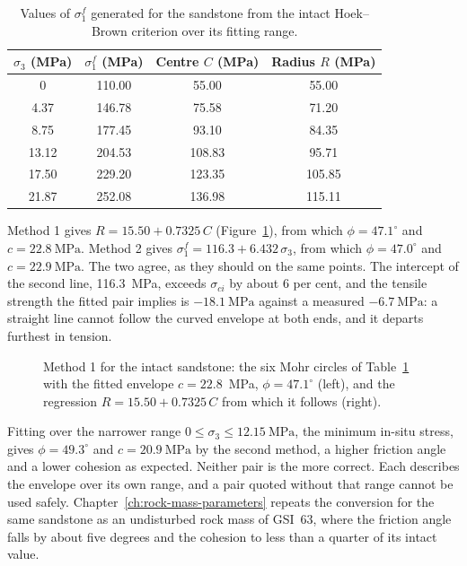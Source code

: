 \begin{table}[htbp]
\caption{Values of \(\sigma_1^f\) generated for the sandstone from the intact
Hoek--Brown criterion over its fitting range.}
\label{tab:sandstone_hb_data}
\centering
\small
\begin{tabular}{c c c c}
\toprule
\(\sigma_3\) (MPa) & \(\sigma_1^f\) (MPa) & Centre \(C\) (MPa) & Radius \(R\) (MPa) \\
\midrule
0 & 110.00 & 55.00 & 55.00 \\
4.37 & 146.78 & 75.58 & 71.20 \\
8.75 & 177.45 & 93.10 & 84.35 \\
13.12 & 204.53 & 108.83 & 95.71 \\
17.50 & 229.20 & 123.35 & 105.85 \\
21.87 & 252.08 & 136.98 & 115.11 \\
\bottomrule
\end{tabular}
\end{table}

Method 1 gives \(R = 15.50 + 0.7325\,C\)
(Figure~\ref{fig:mohr-fit-sandstone}), from which
\(\phi = 47.1^\circ\) and \(c = 22.8~\text{MPa}\). Method 2 gives
\(\sigma_1^f = 116.3 + 6.432\,\sigma_3\), from which \(\phi = 47.0^\circ\)
and \(c = 22.9~\text{MPa}\). The two agree, as they should on the same
points. The intercept of the second line, 116.3~MPa, exceeds
\(\sigma_{ci}\) by about 6 per cent, and the tensile strength the fitted pair
implies is \(-18.1~\text{MPa}\) against a measured \(-6.7~\text{MPa}\): a
straight line cannot follow the curved envelope at both ends, and it departs
furthest in tension.

\begin{figure}[htbp]
\centering
{}
\caption{Method 1 for the intact sandstone: the six Mohr circles of Table~\ref{tab:sandstone_hb_data} with the fitted envelope $c = 22.8$~MPa, $\phi = 47.1^\circ$ (left), and the regression $R = 15.50 + 0.7325\,C$ from which it follows (right).}
\label{fig:mohr-fit-sandstone}
\end{figure}

Fitting over the narrower range \(0 \leq \sigma_3 \leq 12.15~\text{MPa}\),
the minimum in-situ stress, gives \(\phi = 49.3^\circ\) and
\(c = 20.9~\text{MPa}\) by the second method, a higher friction angle and a
lower cohesion as expected. Neither pair is the more correct. Each describes
the envelope over its own range, and a pair quoted without that range cannot
be used safely. Chapter~\ref{ch:rock-mass-parameters} repeats the conversion
for the same sandstone as an undisturbed rock mass of GSI~63, where the
friction angle falls by
about five degrees and the cohesion to less than a quarter of its intact
value.

\chapterreferences
